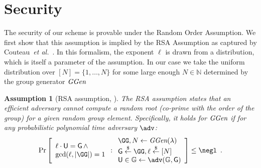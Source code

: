 \documentclass[10pt,conference]{IEEEtran}
\theoremstyle{Definition}
\newtheorem{assumption}{Assumption}
\begin{document}
\section{Security}

The security of our scheme is provable under the Random Order Assumption. We first show that this assumption is implied by the RSA Assumption as captured by Couteau~\emph{et al.}~\cite{EC:CouPetPoi17}. In this formalism, the exponent $\ell$ is drawn from a distribution, which is itself a parameter of the assumption. In our case we take the uniform distribution over $[N] = \{1, \ldots, N\}$ for some large enough $N \in \mathbb{N}$ determined by the group generator $\textit{GGen}$

\begin{assumption}[RSA assumption, \cite{RivShaAdl78,EC:CouPetPoi17}]
	The RSA assumption states that an efficient adversary cannot compute a random root (co-prime with the order of the group) for a given random group element. Specifically, it holds for $\textit{GGen}$ if for any probabilistic polynomial time adversary $\adv$:
	\[
    \Pr\left[
    \begin{array}{l}
    \ell \cdot \gr{U} = \Generator \, \wedge \\
    \gcd(\ell,|\GG|)=1
    \end{array} :
    \begin{array}{l}
         \GG, N \leftarrow \ggen(\lambda)  \\
         \Generator \sample \GG, \ell \sample [N]  \\
         \gr{U} \in \mathbb{G} \leftarrow \adv(\mathbb{G}, \Generator) \\
    \end{array}\right] \leq \negl \enspace .
\]

\end{assumption}
\end{document}
